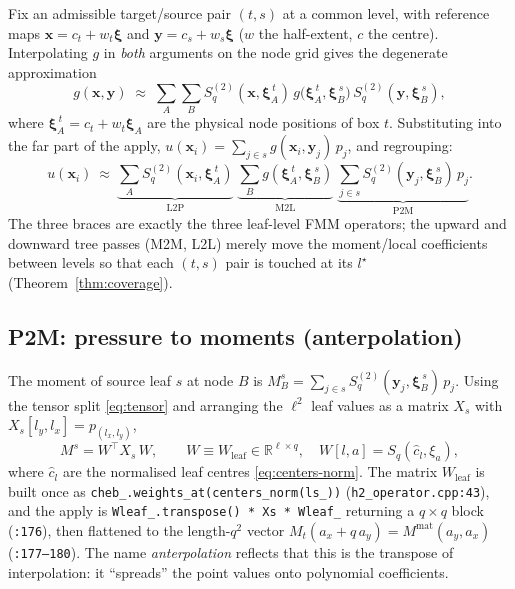 \documentclass[11pt,a4paper]{article}
\newcommand{\R}{\mathbb{R}}
\newcommand{\xx}{\mathbf{x}}
\newcommand{\yy}{\mathbf{y}}
\newcommand{\code}[1]{\texttt{#1}}
\theoremstyle{definition}
\theoremstyle{remark}
\begin{document}
Fix an admissible target/source pair $(t,s)$ at a common level, with reference
maps $\xx=c_t+w_t\boldsymbol\xi$ and $\yy=c_s+w_s\boldsymbol\xi$ ($w$ the
half-extent, $c$ the centre). Interpolating $g$ in \emph{both} arguments on the
node grid gives the degenerate approximation
\begin{equation}
  g(\xx,\yy)\;\approx\;
  \sum_{A}\sum_{B} S_q^{(2)}(\xx,\boldsymbol\xi_A^{\,t})\,
  g\big(\boldsymbol\xi_A^{\,t},\boldsymbol\xi_B^{\,s}\big)\,
  S_q^{(2)}(\yy,\boldsymbol\xi_B^{\,s}),
  \label{eq:far-interp}
\end{equation}
where $\boldsymbol\xi_A^{\,t}=c_t+w_t\boldsymbol\xi_A$ are the physical node
positions of box $t$. Substituting into the far part of the apply,
$u(\xx_i)=\sum_{j\in s} g(\xx_i,\yy_j)\,p_j$, and regrouping:
\begin{equation}
  u(\xx_i)\ \approx\
  \underbrace{\sum_A S_q^{(2)}(\xx_i,\boldsymbol\xi_A^{\,t})}_{\text{L2P}}
  \;\underbrace{\sum_B g(\boldsymbol\xi_A^{\,t},\boldsymbol\xi_B^{\,s})}_{\text{M2L}}
  \;\underbrace{\sum_{j\in s} S_q^{(2)}(\yy_j,\boldsymbol\xi_B^{\,s})\,p_j}_{\text{P2M}}.
  \label{eq:regroup}
\end{equation}
The three braces are exactly the three leaf-level FMM operators; the upward and
downward tree passes (M2M, L2L) merely move the moment/local coefficients between
levels so that each $(t,s)$ pair is touched at its $l^\star$ (Theorem~\ref{thm:coverage}).

\subsection{P2M: pressure to moments (anterpolation)}
\label{sec:p2m}

The moment of source leaf $s$ at node $B$ is
$M_B^s = \sum_{j\in s} S_q^{(2)}(\yy_j,\boldsymbol\xi_B^{\,s})\,p_j$. Using the
tensor split \eqref{eq:tensor} and arranging the $\ell^2$ leaf values as a matrix
$X_s$ with $X_s[l_y,l_x]=p_{(l_x,l_y)}$,
\begin{equation}
  M^s = W^\top X_s\, W, \qquad W \equiv W_{\text{leaf}}\in\R^{\ell\times q},\quad
  W[l,a]=S_q(\hat c_l,\xi_a),
  \label{eq:p2m}
\end{equation}
where $\hat c_l$ are the normalised leaf centres \eqref{eq:centers-norm}. The
matrix $W_{\text{leaf}}$ is built once as
\code{cheb\_.weights\_at(centers\_norm(ls\_))} (\code{h2\_operator.cpp:43}), and
the apply is \code{Wleaf\_.transpose() * Xs * Wleaf\_} returning a $q\times q$
block (\code{:176}), then flattened to the length-$q^2$ vector
$M_t(a_x+q\,a_y)=M^{\text{mat}}(a_y,a_x)$ (\code{:177--180}). The name
\emph{anterpolation} reflects that this is the transpose of interpolation: it
``spreads'' the point values onto polynomial coefficients.
\end{document}
